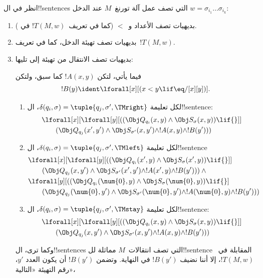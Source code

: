 \documentclass[../../../include/open-logic-section]{subfiles}
\begin{document}
انظر في ال!!{sentence}s التي تصف عمل آلة تورنغ~$M$ عند الدخل
$w=\sigma_{i_1}\dots\sigma_{i_k}$:
\begin{enumerate}
\item بديهيات تصف الأعداد و~$<$ (كما في تعريف~$!T(M,w)$ في
).
\item بديهيات تصف تهيئة الدخل، كما في تعريف~$!T(M,w)$.
\item بديهيات تصف الانتقال من تهيئة إلى تليها:

فيما يأتي، لتكن $!A(x,y)$ كما سبق، ولتكن
\[
  !B(y) \ident \lforall[x][(x < y \lif \eq/[x][y])].
\]
\begin{enumerate}
\item {} لكل تعليمة $\delta(q_i,\sigma)=
  \tuple{q_j,\sigma',\TMright}$، ال!!{sentence}:
\begin{align*}
& \lforall[x][\lforall[y][(
   (\Obj Q_{q_i}(x, y) \land \Obj S_{\sigma}(x, y)) \lif {}]] \\
&\qquad   (\Obj Q_{q_j}(x', y') \land \Obj S_{\sigma'}(x, y') \land
!A(x, y) \land !B(y')))
\end{align*}
\item {} لكل تعليمة $\delta(q_i,\sigma)=
  \tuple{q_j,\sigma',\TMleft}$، ال!!{sentence}
\begin{align*}
& \lforall[x][\lforall[y][
    ((\Obj Q_{q_i}(x', y) \land \Obj S_{\sigma}(x', y)) \lif {}]]\\
& \qquad   (\Obj Q_{q_j}(x, y') \land \Obj S_{\sigma'}(x', y') \land
!A(x', y) \land !B(y'))) \land {}\\
& \lforall[y][((\Obj Q_{q_i}(\num{0}, y) \land \Obj S_{\sigma}(\num{0},
    y)) \lif {}]\\
& \qquad (\Obj Q_{q_j}(\num{0}, y') \land \Obj S_{\sigma'}(\num{0},
  y') \land !A(\num{0}, y) \land !B(y')))
\end{align*}
\item {} لكل تعليمة $\delta(q_i,\sigma)=
  \tuple{q_j,\sigma',\TMstay}$، ال!!{sentence}:
\begin{align*}
& \lforall[x][\lforall[y][(
   (\Obj Q_{q_i}(x, y) \land \Obj S_{\sigma}(x, y)) \lif {}]] \\
&\qquad (\Obj Q_{q_j}(x, y') \land \Obj S_{\sigma'}(x, y') \land
!A(x, y) \land !B(y')))
\end{align*}
\end{enumerate}
وكما ترى، ال!!{sentence}s التي تصف انتقالات~$M$ مماثلة
لل!!{sentence} المقابلة في~$!T(M,w)$، إلا أننا نضيف $!B(y')$ في
النهاية. وتضمن $!B(y')$ أن يكون العدد $y'$، رقم التهيئة «التالية»،

\end{enumerate}
\end{document}
